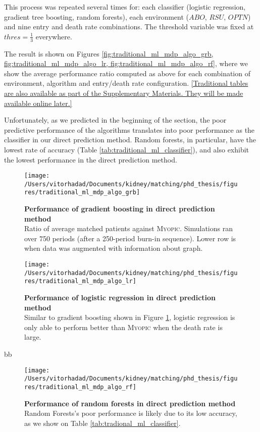 This process was repeated several times for: each classifier (logistic regression, gradient tree boosting, random forests), each environment ($ABO$, $RSU$, $OPTN$) and nine entry and death rate combinations. The threshold variable was fixed at $thres = \frac{1}{3}$ everywhere.

The result is shown on Figures \ref{fig:traditional_ml_mdp_algo_grb, fig:traditional_ml_mdp_algo_lr, fig:traditional_ml_mdp_algo_rf}, where we show the average performance ratio computed as above for each combination of environment, algorithm and entry/death rate configuration. \ref{Traditional tables are also available as part of the Supplementary Materials. They will be made available online later.}

Unfortunately, as we predicted in the beginning of the section, the poor predictive performance of the algorithms translates into poor performance as the classifier in our direct prediction method. Random forests, in particular, have the lowest rate of accuracy (Table \ref{tab:traditional_ml_classifier}), and also exhibit the lowest performance in the direct prediction method.


\begin{figure}
\centering
\texttt{[image: /Users/vitorhadad/Documents/kidney/matching/phd\_thesis/figures/traditional\_ml\_mdp\_algo\_grb]}
\caption[Performance of gradient boosting in direct prediction method]{\textbf{Performance of gradient boosting in direct prediction method} \\
    Ratio of average matched patients against \textsc{Myopic}. Simulations ran over 750 periods (after a 250-period burn-in sequence). Lower row is when data was augmented with information about graph.}
\label{fig:traditional_ml_mdp_algo_grb}
\end{figure}

\begin{figure}
\centering
\texttt{[image: /Users/vitorhadad/Documents/kidney/matching/phd\_thesis/figures/traditional\_ml\_mdp\_algo\_lr]}
\caption[Performance of logistic regression in direct prediction method]{\textbf{Performance of logistic regression in direct prediction method} \\
    Similar to gradient boosting shown in Figure \ref{fig:traditional_ml_mdp_algo_grb}, logistic regression is only able to perform better than \textsc{Myopic} when the death rate is large.}
\label{fig:traditional_ml_mdp_algo_lr}
\end{figure}
bb
\begin{figure}
\centering
\texttt{[image: /Users/vitorhadad/Documents/kidney/matching/phd\_thesis/figures/traditional\_ml\_mdp\_algo\_rf]}
\caption[Performance of random forests in direct prediction method]{\textbf{Performance of random forests in direct prediction method} \\
    Random Forests's poor performance is likely due to its low accuracy, as we show on Table \ref{tab:tradional_ml_classifier}.}
\label{fig:traditional_ml_mdp_algo_rf}
\end{figure}

